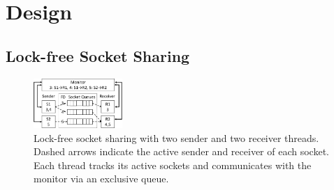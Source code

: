 

\section{Design}
\label{sec:design}


\subsection{Lock-free Socket Sharing}
\label{subsec:fork}


\begin{figure}[t!]
	\centering
	\includegraphics[width=0.3\textwidth]{images/queue_arch}
	\vspace{-5pt}
	\caption{Lock-free socket sharing with two sender and two receiver threads. Dashed arrows indicate the active sender and receiver of each socket. Each thread tracks its active sockets and communicates with the monitor via an exclusive queue.}
	\label{fig:queue-arch}
\end{figure}

